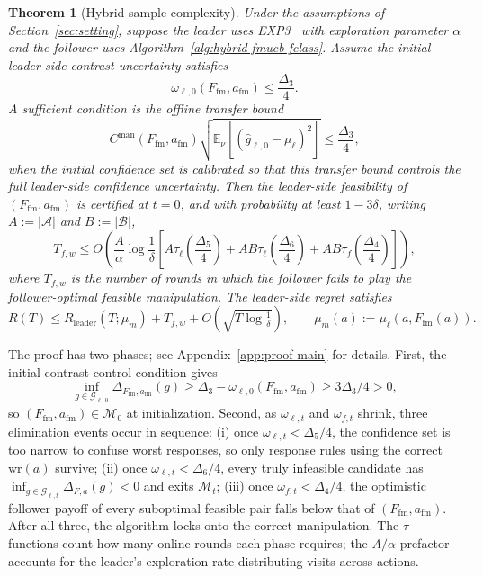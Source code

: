\documentclass{article}
\newcommand{\cA}{\mathcal{A}}
\newcommand{\cB}{\mathcal{B}}
\newcommand{\cG}{\mathcal{G}}
\newcommand{\cM}{\mathcal{M}}
\newcommand{\E}{\mathbb{E}}           %
\newtheorem{theorem}{Theorem}
\begin{document}
\begin{theorem}[Hybrid sample complexity]
\label{thm:hybrid-cman-exp3}
Under the assumptions of Section~\ref{sec:setting}, suppose the leader uses EXP3~\cite{auer2002nonstochastic} with exploration parameter $\alpha$ and the follower uses Algorithm~\ref{alg:hybrid-fmucb-fclass}. Assume the initial leader-side contrast uncertainty satisfies
\[
    \omega_{\ell,0}(F_{\mathrm{fm}},a_{\mathrm{fm}})\le \frac{\Delta_3}{4}.
\]
A sufficient condition is the offline transfer bound
\[
    C^{\mathrm{man}}(F_{\mathrm{fm}},a_{\mathrm{fm}})
    \sqrt{\E_\nu[(\widehat g_{\ell,0}-\mu_\ell)^2]}
    \le \frac{\Delta_3}{4},
\]
when the initial confidence set is calibrated so that this transfer bound controls the full leader-side confidence uncertainty. Then the leader-side feasibility of $(F_{\mathrm{fm}},a_{\mathrm{fm}})$ is certified at $t=0$, and with probability at least $1-3\delta$, writing $A:=|\cA|$ and $B:=|\cB|$,
\begin{equation}
T_{f,w}\le
O\!\left(\frac{A}{\alpha}\log\frac1\delta
\left[A\tau_\ell\!\left(\frac{\Delta_5}{4}\right)+AB\tau_\ell\!\left(\frac{\Delta_6}{4}\right)+AB\tau_f\!\left(\frac{\Delta_4}{4}\right)\right]\right),
\label{eq:cman-main-bound}
\end{equation}
where $T_{f,w}$ is the number of rounds in which the follower fails to play the follower-optimal feasible manipulation. The leader-side regret satisfies
\[
    R(T)\le R_{\mathrm{leader}}(T;\mu_m)+T_{f,w}+O\!\left(\sqrt{T\log\tfrac{1}{\delta}}\right),
    \qquad \mu_m(a):=\mu_\ell(a,F_{\mathrm{fm}}(a)).
\]
\end{theorem}
The proof has two phases; see Appendix~\ref{app:proof-main} for details. First, the initial contrast-control condition gives
\[
    \inf_{g\in\cG_{\ell,0}}\Delta_{F_{\mathrm{fm}},a_{\mathrm{fm}}}(g)
    \ge \Delta_3-\omega_{\ell,0}(F_{\mathrm{fm}},a_{\mathrm{fm}})
    \ge 3\Delta_3/4>0,
\]
so $(F_{\mathrm{fm}},a_{\mathrm{fm}})\in\cM_0$ at initialization. Second, as $\omega_{\ell,t}$ and $\omega_{f,t}$ shrink, three elimination events occur in sequence: (i) once $\omega_{\ell,t}<\Delta_5/4$, the confidence set is too narrow to confuse worst responses, so only response rules using the correct $\mathrm{wr}(a)$ survive; (ii) once $\omega_{\ell,t}<\Delta_6/4$, every truly infeasible candidate has $\inf_{g\in\cG_{\ell,t}}\Delta_{F,a}(g)<0$ and exits $\cM_t$; (iii) once $\omega_{f,t}<\Delta_4/4$, the optimistic follower payoff of every suboptimal feasible pair falls below that of $(F_{\mathrm{fm}},a_{\mathrm{fm}})$. After all three, the algorithm locks onto the correct manipulation. The $\tau$ functions count how many online rounds each phase requires; the $A/\alpha$ prefactor accounts for the leader's exploration rate distributing visits across actions.
\end{document}

